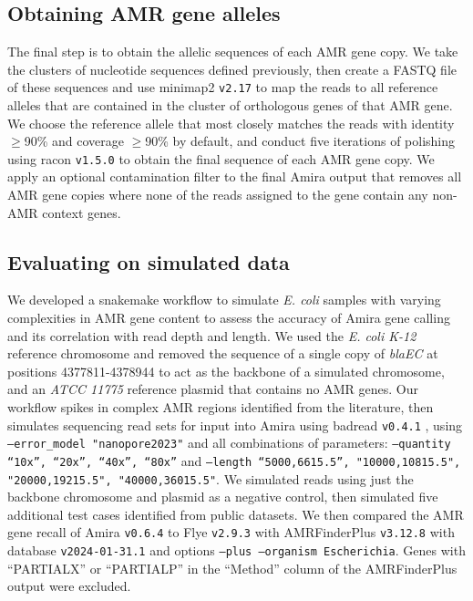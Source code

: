 \subsection*{Obtaining AMR gene alleles}

The final step is to obtain the allelic sequences of each AMR gene copy. We take the clusters of nucleotide sequences defined previously, then create a FASTQ file of these sequences and use minimap2 \texttt{v2.17} \cite{10.1093/bioinformatics/bty191} to map the reads to all reference alleles that are contained in the cluster of orthologous genes of that AMR gene. We choose the reference allele that most closely matches the reads with identity $\ge$90\% and coverage $\ge$90\% by default, and conduct five iterations of polishing using racon \texttt{v1.5.0} \cite{10.1101/gr.214270.116} to obtain the final sequence of each AMR gene copy. We apply an optional contamination filter to the final Amira output that removes all AMR gene copies where none of the reads assigned to the gene contain any non-AMR context genes.

\subsection*{Evaluating on simulated data}

We developed a snakemake \cite{10.1093/bioinformatics/bts480} workflow to simulate \textit{E. coli} samples with varying complexities in AMR gene content to assess the accuracy of Amira gene calling and its correlation with read depth and length. We used the \textit{E. coli K-12} reference chromosome and removed the sequence of a single copy of \textit{blaEC} at positions 4377811-4378944 to act as the backbone of a simulated chromosome, and an \textit{ATCC 11775} reference plasmid that contains no AMR genes. Our workflow spikes in complex AMR regions identified from the literature, then simulates sequencing read sets for input into Amira using badread \texttt{v0.4.1} \cite{Wick2019}, using \texttt{--error\_model "nanopore2023"} and all combinations of parameters: \texttt{--quantity “10x”, “20x”, “40x”, “80x”} and \texttt{--length “5000,6615.5”, "10000,10815.5", "20000,19215.5", "40000,36015.5"}. We simulated reads using just the backbone chromosome and plasmid as a negative control, then simulated five additional test cases identified from public datasets. We then compared the AMR gene recall of Amira \texttt{v0.6.4} to Flye \texttt{v2.9.3} with AMRFinderPlus \texttt{v3.12.8} \cite{Feldgarden2021} with database \texttt{v2024-01-31.1} and options \texttt{--plus --organism Escherichia}. Genes with “PARTIALX” or “PARTIALP” in the “Method” column of the AMRFinderPlus output were excluded.

